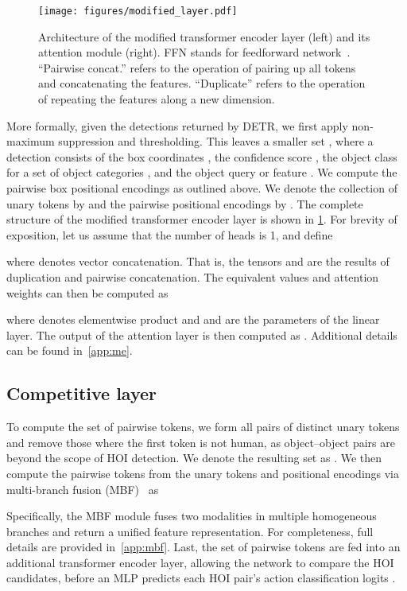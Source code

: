 \documentclass[10pt,twocolumn,letterpaper]{article}
\begin{document}
\begin{figure}[t]
    \centering
    \texttt{[image: figures/modified\_layer.pdf]}
    \caption{Architecture of the modified transformer encoder layer (left) and its attention module (right). FFN stands for feedforward network~\cite{xfmer}. ``Pairwise concat.'' refers to the operation of pairing up all tokens and concatenating the features. ``Duplicate'' refers to the operation of repeating the features along a new dimension.}
    \label{fig:modified-layer}
\end{figure}

More formally, given the detections returned by DETR, we first apply non-maximum suppression and thresholding. This leaves a smaller set , where a detection  consists of the box coordinates , the confidence score , the object class  for a set of object categories , and the object query or feature . We compute the pairwise box positional encodings  as outlined above. We denote the collection of unary tokens by  and the pairwise positional encodings by . The complete structure of the modified transformer encoder layer is shown in \cref{fig:modified-layer}. For brevity of exposition, let us assume that the number of heads  is 1, and define

where  denotes vector concatenation. That is, the tensors  and  are the results of duplication and pairwise concatenation. The equivalent values and attention weights can then be computed as

where  denotes elementwise product and  and  are the parameters of the linear layer. The output of the attention layer is then computed as .
Additional details can be found in~\cref{app:me}.

\subsection{Competitive layer}

To compute the set of pairwise tokens, we form all pairs of distinct unary tokens and remove those where the first token is not human, as object--object pairs are beyond the scope of HOI detection. We denote the resulting set as . We then compute the pairwise tokens from the unary tokens and positional encodings via multi-branch fusion (MBF)~\cite{scg} as

Specifically, the MBF module fuses two modalities in multiple homogeneous branches and return a unified feature representation. For completeness, full details are provided in~\cref{app:mbf}. Last, the set of pairwise tokens are fed into an additional transformer encoder layer, allowing the network to compare the HOI candidates, before an MLP predicts each HOI pair's action classification logits .
\end{document}

